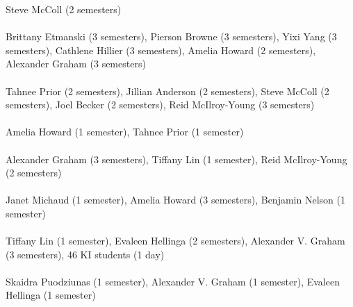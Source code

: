 \documentclass[11pt, a4paper]{article}
\newcommand{\note}[1]{\marginnote{\scriptsize #1}}
\begin{document}
Steve McColl (2 semesters)
\\[.2cm]
\note{2016}\\ Brittany Etmanski (3 semesters),
Pierson Browne (3 semesters), Yixi Yang (3 semesters), Cathlene Hillier
(3 semesters), Amelia Howard (2 semesters), Alexander Graham (3
semesters)  \\ \\ Tahnee Prior (2 semesters),
Jillian Anderson (2 semesters), Steve McColl (2 semesters), Joel Becker
(2 semesters), Reid McIlroy-Young (3 semesters)
\\[.2cm]
\note{2015}\\ Amelia Howard (1 semester), Tahnee
Prior (1 semester)  \\ \\ Alexander Graham (3
semesters), Tiffany Lin (1 semester), Reid McIlroy-Young (2 semesters)
\\[.2cm]
\note{2014}\\ Janet Michaud (1 semester), Amelia
Howard (3 semesters), Benjamin Nelson (1
semester)  \\ \\ Tiffany Lin (1 semester),
Evaleen Hellinga (2 semesters), Alexander V. Graham (3 semesters), 46 KI
students (1 day)
\\[.2cm]
\note{2013}\\ Skaidra Puodziunas (1 semester),
Alexander V. Graham (1 semester), Evaleen Hellinga (1 semester) 
\\[.2cm]
\end{document}
